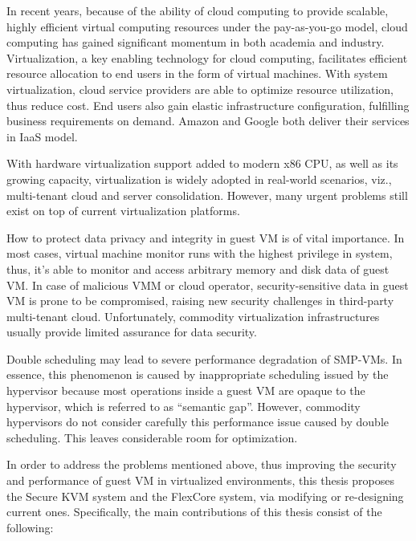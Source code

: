 \begin{englishabstract}

In recent years, because of the ability of cloud computing to provide scalable, highly efficient virtual computing resources under the pay-as-you-go model, cloud computing has gained significant momentum in both academia and industry. Virtualization, a key enabling technology for cloud computing, facilitates efficient resource allocation to end users in the form of virtual machines. With system virtualization, cloud service providers are able to optimize resource utilization, thus reduce cost. End users also gain elastic infrastructure configuration, fulfilling business requirements on demand. Amazon and Google both deliver their services in IaaS model.

With hardware virtualization support added to modern x86 CPU, as well as its growing capacity, virtualization is widely adopted in real-world scenarios, viz., multi-tenant cloud and server consolidation. However, many urgent problems still exist on top of current virtualization platforms. 

How to protect data privacy and integrity in guest VM is of vital importance. In most cases, virtual machine monitor runs with the highest privilege in system, thus, it's able to monitor and access arbitrary memory and disk data of guest VM. In case of malicious VMM or cloud operator, security-sensitive data in guest VM is prone to be compromised, raising new security challenges in third-party multi-tenant cloud. Unfortunately, commodity virtualization infrastructures usually provide limited assurance for data security. 

Double scheduling may lead to severe performance degradation of SMP-VMs. In essence, this phenomenon is caused by inappropriate scheduling issued by the hypervisor because most operations inside a guest VM are opaque to the hypervisor, which is referred to as ``semantic gap''. However, commodity hypervisors do not consider carefully this performance issue caused by double scheduling. This leaves considerable room for optimization.

In order to address the problems mentioned above, thus improving the security and performance of guest VM in virtualized environments, this thesis proposes the Secure KVM system and the FlexCore system, via modifying or re-designing current ones. Specifically, the main contributions of this thesis consist of the following:


\end{englishabstract}
